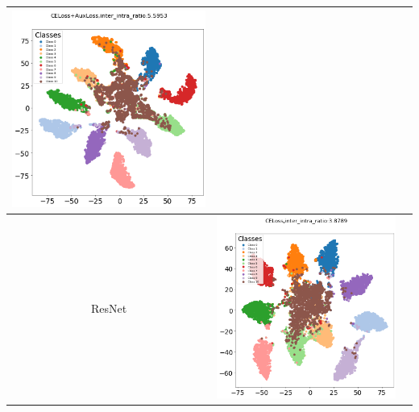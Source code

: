 \begin{table}[H]
\begin{tabular}{|c|c|c|}
\begin{minipage}{0.45\textwidth} \centering \includegraphics[width=\textwidth]{assets/vgg16_tsne_feature_c.png} \end{minipage} \\ \hline
\begin{minipage}{0.1\textwidth} \centering ResNet \end{minipage} & 
\begin{minipage}{0.45\textwidth} \centering \includegraphics[width=\textwidth]{assets/resnet50_tsne_feature.png} \end{minipage} & 

\end{tabular}
\end{table}
